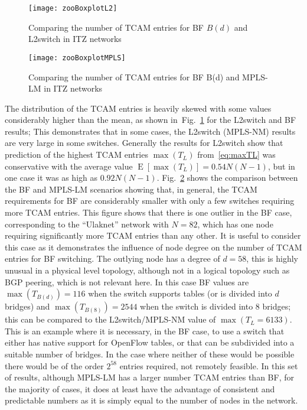 \documentclass[conference]{IEEEtran}
\DeclareMathOperator{\E}{E}
\newcommand{\figref}[1]{Fig.~\ref{#1}}
\begin{document}
\begin{figure}[tb]
  \centering
\texttt{[image: zooBoxplotL2]}
  \caption{Comparing the number of  TCAM entries for BF $B(d)$ and L2switch
    in ITZ networks}
  \label{fig:zooBoxPlotL2}
\end{figure}
\begin{figure}[tb]
  \centering
\texttt{[image: zooBoxplotMPLS]}
  \caption{Comparing the number of  TCAM entries for BF B(d) and MPLS-LM
    in ITZ networks}
  \label{fig:zooBoxPlotMPLS}
\end{figure}
The distribution of the TCAM entries is heavily skewed with some values considerably higher than the mean, as shown in~\figref{fig:zooBoxPlotL2} for the L2switch and BF results; This demonstrates that in some cases, the L2switch (MPLS-NM) results are very large in some switches. Generally the results for L2switch show that prediction of the highest TCAM entries $\max(T_L)$ from~\eqref{eq:maxTL} was conservative with the average value $\E[\max(T_L)]=0.54 N(N-1)$, but in one case it was as high as $0.92 N(N-1)$.  \figref{fig:zooBoxPlotMPLS} shows the comparison between the BF and MPLS-LM scenarios showing that, in general, the TCAM requirements for BF are considerably smaller with only a few switches requiring more TCAM entries. This figure shows that there is one outlier in the BF case, corresponding to the  ``Ulaknet'' network with $N=82$, which has one node requiring significantly more TCAM entries than any other. It is useful to consider this case as it demonstrates the influence of node degree on the number of TCAM entries for BF switching. The outlying node has a degree of $d=58$, this is highly unusual in a physical level topology, although not in a logical topology such as BGP peering, which is not relevant here. In this case BF values are $\max(T_{B(d)})=116$ when the switch supports tables (or is divided into $d$ bridges) and $\max(T_{B(8)})=2544$ when the switch is divided into 8 bridges; this can be compared to the L2switch/MPLS-NM value of  $\max(T_L=6133)$. This is an example where it is necessary, in the BF case, to use a switch that either has native support for OpenFlow tables, or that can be subdivided into a suitable number of bridges. In the case where neither of these would be possible there would be of the order $2^{58}$ entries required, not remotely feasible. In this set of results, although MPLS-LM has a larger number TCAM entries than BF, for the majority of cases, it does at least have the advantage of consistent and predictable numbers as it is simply equal to the number of nodes in the network.
\end{document}
